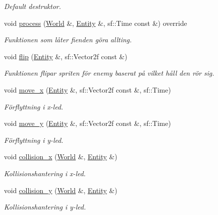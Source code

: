 \begin{DoxyCompactItemize}
\begin{DoxyCompactList}\small\item\em Default destruktor. \end{DoxyCompactList}\item 
void \hyperlink{classEnemy2__Behaviour_a0979bade3f9b3ff9dca3c6b970a5ef63}{process} (\hyperlink{classWorld}{World} \&, \hyperlink{classEntity}{Entity} \&, sf\+::\+Time const \&) override
\begin{DoxyCompactList}\small\item\em Funktionen som låter fienden göra allting. \end{DoxyCompactList}\item 
void \hyperlink{classEnemy2__Behaviour_ad46bf8d3c702e70978b87b36190d2f88}{flip} (\hyperlink{classEntity}{Entity} \&, sf\+::\+Vector2f const \&)
\begin{DoxyCompactList}\small\item\em Funktionen flipar spriten för enemy baserat på vilket håll den rör sig. \end{DoxyCompactList}\item 
void \hyperlink{classEnemy2__Behaviour_a188c7941d10c527271c49ba0bc26baa9}{move\+\_\+x} (\hyperlink{classEntity}{Entity} \&, sf\+::\+Vector2f const \&, sf\+::\+Time)
\begin{DoxyCompactList}\small\item\em Förflyttning i x-\/led. \end{DoxyCompactList}\item 
void \hyperlink{classEnemy2__Behaviour_a535c14bb1fa65c443d35e4e55031418b}{move\+\_\+y} (\hyperlink{classEntity}{Entity} \&, sf\+::\+Vector2f const \&, sf\+::\+Time)
\begin{DoxyCompactList}\small\item\em Förflyttning i y-\/led. \end{DoxyCompactList}\item 
void \hyperlink{classEnemy2__Behaviour_a25d895919b81e15a7e4280d86ded650f}{collision\+\_\+x} (\hyperlink{classWorld}{World} \&, \hyperlink{classEntity}{Entity} \&)
\begin{DoxyCompactList}\small\item\em Kollisionshantering i x-\/led. \end{DoxyCompactList}\item 
void \hyperlink{classEnemy2__Behaviour_a5e89430e0189000bc295db5246c5d380}{collision\+\_\+y} (\hyperlink{classWorld}{World} \&, \hyperlink{classEntity}{Entity} \&)
\begin{DoxyCompactList}\small\item\em Kollisionshantering i y-\/led. \end{DoxyCompactList}\end{DoxyCompactItemize}

